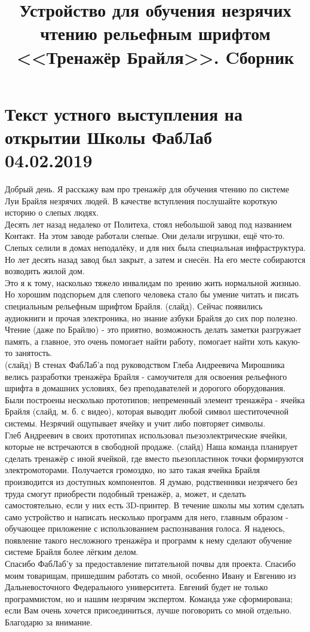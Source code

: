 \documentclass[a4paper,12pt]{article} %
\begin{document}
\title{Устройство для обучения незрячих чтению рельефным шрифтом <<Тренажёр Брайля>>. Cборник}
\maketitle
\tableofcontents
\section{Текст устного выступления на открытии Школы ФабЛаб 04.02.2019}
Добрый день. Я расскажу вам про тренажёр для обучения чтению по системе Луи Брайля незрячих людей. В качестве вступления послушайте короткую историю о слепых людях.\\
Десять лет назад недалеко от Политеха, стоял небольшой завод под названием Контакт. На этом заводе работали слепые. Они делали игрушки, ещё что-то. Слепых селили в домах неподалёку, и для них была специальная инфраструктура. Но лет десять назад завод был закрыт, а затем и снесён. На его месте собираются возводить жилой дом.\\
Это  я к тому, насколько тяжело инвалидам по зрению жить нормальной жизнью. Но хорошим подспорьем для слепого человека стало бы умение читать и писать специальным рельефным шрифтом Брайля. (слайд). Сейчас появились аудиокниги и прочая электроника, но знание азбуки Брайля до сих пор полезно. Чтение (даже по Брайлю) - это приятно, возможность делать заметки разгружает память, а главное, это очень помогает найти работу, помогает найти хоть какую-то занятость. \\
(слайд) В стенах ФабЛаб'а под руководством Глеба Андреевича Мирошника велись разработки тренажёра Брайля - самоучителя для освоения рельефного шрифта в домашних условиях, без преподавателей и дорогого оборудования. Были построены несколько прототипов; непременный элемент тренажёра - ячейка Брайля (слайд, м. б. с видео), которая выводит любой символ шеститочечной системы. Незрячий ощупывает ячейку и учит либо повторяет символы. \\
Глеб Андреевич в своих прототипах использовал пьезоэлектрические ячейки, которые не встречаются в свободной продаже.  (слайд) Наша команда планирует сделать тренажёр с иной ячейкой, где вместо пьезопластинок точки формируются электромоторами. Получается громоздко, но зато такая ячейка Брайля производится из доступных компонентов. Я думаю, родственники незрячего без труда смогут приобрести подобный тренажёр, а, может, и сделать самостоятельно, если у них есть 3D-принтер. В течение школы мы хотим сделать само устройство и написать несколько программ для него,  главным образом - обучающее приложение с использованием распознавания голоса. Я надеюсь, появление такого несложного тренажёра и программ к нему сделают обучение системе Брайля более лёгким делом.\\
Спасибо ФабЛаб'у за предоставление питательной почвы для проекта. Спасибо моим товарищам, пришедшим работать со мной, особенно Ивану и Евгению из Дальневосточного Федерального университета. Евгений будет не только программистом, но и нашим незрячим экспертом. Команда уже сформирована; если Вам очень хочется присоединиться, лучше поговорить со мной отдельно.\\
Благодарю за внимание.
\end{document}
